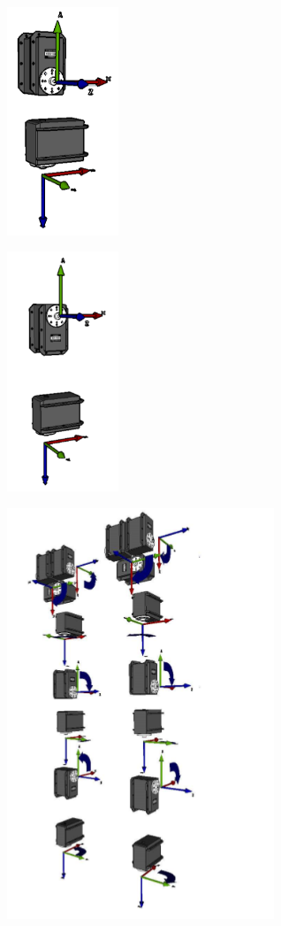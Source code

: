 \documentclass[user_manual.tex]{subfiles}
\begin{document}
\begin{center}
\includegraphics[width=0.25\textwidth]{Figures/Hardware/Cinematica/Cine_4.png}
\end{center}

\begin{center}
\includegraphics[width=0.25\textwidth]{Figures/Hardware/Cinematica/Cine_5.png}
\end{center}

\begin{center}
\includegraphics[width=0.6\textwidth]{Figures/Hardware/Cinematica/Cine_6.png}
\end{center}
\end{document}
